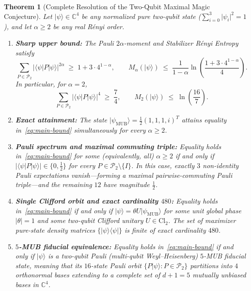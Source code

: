 \documentclass[11pt,a4paper]{article}
\theoremstyle{plain}
\newtheorem{theorem}{Theorem}[section]
\theoremstyle{definition}
\theoremstyle{remark}
\newcommand{\C}{\mathbb{C}}
\newcommand{\ket}[1]{\lvert #1 \rangle}
\newcommand{\ketbra}[2]{\lvert #1 \rangle\langle #2 \rvert}
\newcommand{\expval}[2]{\langle #1 \vert #2 \vert #1 \rangle}
\newcommand{\Cl}{\mathrm{Cl}}
\newcommand{\Pauli}{\mathcal{P}}
\newcommand{\psimub}{\ket{\psi_{\mathrm{MUB}}}}
\begin{document}
\begin{theorem}[Complete Resolution of the Two-Qubit Maximal Magic Conjecture]
\label{thm:main}
Let $\ket{\psi} \in \C^4$ be any normalized pure two-qubit state ($\sum_{i=0}^3 \lvert\psi_i\rvert^2 = 1$), and let $\alpha \ge 2$ be any real R\'enyi order.
\begin{enumerate}[label=\textup{(\roman*)}, leftmargin=2.2em]
  \item \textbf{Sharp upper bound:} The Pauli $2\alpha$-moment and Stabilizer R\'enyi Entropy satisfy
  \begin{equation}
    \label{eq:main-bound}
    \sum_{P \in \Pauli_2} \lvert\expval{\psi}{P}\rvert^{2\alpha} \;\ge\; 1 + 3 \cdot 4^{1-\alpha},
    \qquad
    M_\alpha(\ket{\psi}) \;\le\; \frac{1}{1-\alpha}\ln\!\left(\frac{1 + 3 \cdot 4^{1-\alpha}}{4}\right).
  \end{equation}
  In particular, for $\alpha = 2$,
  \begin{equation}
    \label{eq:main-alpha2}
    \sum_{P \in \Pauli_2} \lvert\expval{\psi}{P}\rvert^{4} \;\ge\; \frac{7}{4},
    \qquad
    M_2(\ket{\psi}) \;\le\; \ln\!\left(\frac{16}{7}\right).
  \end{equation}
  \item \textbf{Exact attainment:} The state $\psimub = \frac{1}{2}(1, 1, 1, i)^T$ attains equality in~\eqref{eq:main-bound} simultaneously for every $\alpha \ge 2$.
  \item \textbf{Pauli spectrum and maximal commuting triple:} Equality holds in~\eqref{eq:main-bound} for some (equivalently, all) $\alpha \ge 2$ if and only if $\lvert\expval{\psi}{P}\rvert \in \{0, \frac{1}{2}\}$ for every $P \in \Pauli_2 \setminus \{I\}$. In this case, exactly $3$ non-identity Pauli expectations vanish---forming a maximal pairwise-commuting Pauli triple---and the remaining $12$ have magnitude $\frac{1}{2}$.
  \item \textbf{Single Clifford orbit and exact cardinality $480$:} Equality holds in~\eqref{eq:main-bound} if and only if $\ket{\psi} = \theta U \psimub$ for some unit global phase $\lvert\theta\rvert = 1$ and some two-qubit Clifford unitary $U \in \Cl_2$. The set of maximizer pure-state density matrices $\{\ketbra{\psi}{\psi}\}$ is finite of exact cardinality $480$.
  \item \textbf{$5$-MUB fiducial equivalence:} Equality holds in~\eqref{eq:main-bound} if and only if $\ket{\psi}$ is a two-qubit Pauli (multi-qubit Weyl--Heisenberg) $5$-MUB fiducial state, meaning that its $16$-state Pauli orbit $\{P\ket{\psi} : P \in \Pauli_2\}$ partitions into $4$ orthonormal bases extending to a complete set of $d+1 = 5$ mutually unbiased bases in $\C^4$.

\end{enumerate}
\end{theorem}
\end{document}
